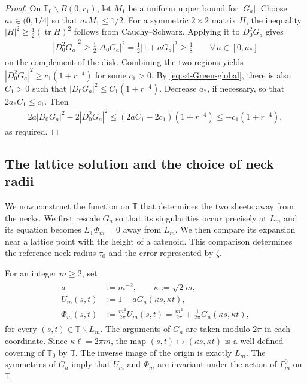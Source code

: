 \documentclass[a4paper,11pt,oneside,reqno]{amsart}
\numberwithin{equation}{section}
\theoremstyle{definition}
\begin{document}
\begin{proof}
    On $\mathbb T_0\smallsetminus B(0,r_1)$, let
    $M_1$ be a uniform upper bound for $|G_a|$.
    Choose $a_*\in(0,1/4]$ so that $a_*M_1\leq1/2$.
    For a symmetric $2\times2$ matrix $H$, the inequality
    $|H|^2\geq\frac12(\operatorname{tr}H)^2$ follows
    from Cauchy--Schwarz. Applying it to $D_0^2G_a$ gives
    \begin{align*}
        |D_0^2G_a|^2
        \geq\frac12|\Delta_0G_a|^2
        =\frac12|1+aG_a|^2\geq\frac18
        \qquad\forall\,a\in[0,a_*]
    \end{align*}
    on the complement of the disk. Combining the two
    regions yields
    $|D_0^2G_a|^2\geq c_1(1+r^{-4})$ for some $c_1>0$.
    By \eqref{eq:s4-Green-global}, there is also $C_1>0$
    such that $|D_0G_a|^2\leq C_1(1+r^{-4})$.
    Decrease $a_*$, if necessary, so that
    $2a_*C_1\leq c_1$. Then
    \begin{align*}
        2a|D_0G_a|^2-2|D_0^2G_a|^2
        \leq(2aC_1-2c_1)(1+r^{-4})
        \leq-c_1(1+r^{-4}),
    \end{align*}
    as required.
\end{proof}

\subsection{The lattice solution and the choice of neck radii}

We now construct the function on $\mathbb T$ that determines
the two sheets away from the necks. We first rescale $G_a$
so that its singularities occur precisely at $L_m$ and its
equation becomes $L_{\mathbb T}\Phi_m=0$ away from $L_m$.
We then compare its expansion near a lattice point with the
height of a catenoid. This comparison determines the reference
neck radius $\tau_0$ and the error represented by $\zeta$.

For an integer $m\geq2$, set
%
\begin{align}
    \label{eq:s4-physical-Green}
    \begin{split}
        a&:=m^{-2},\qquad \kappa:=\sqrt2m,\\
        U_m(s,t)&:=1+aG_a(\kappa s,\kappa t),\\
        \Phi_m(s,t)&:=\frac{m^2}{2\pi}U_m(s,t)
        =\frac{m^2}{2\pi}+\frac1{2\pi}G_a(\kappa s,\kappa t),
    \end{split}
\end{align}
%
for every $(s,t)\in\mathbb T\smallsetminus L_m$.
The arguments of $G_a$ are taken modulo $2\pi$ in each
coordinate. Since $\kappa\ell=2\pi m$, the map
$(s,t)\mapsto(\kappa s,\kappa t)$ is a well-defined
covering of $\mathbb T_0$ by $\mathbb T$. The inverse
image of the origin is exactly $L_m$. The symmetries of
$G_a$ imply that $U_m$ and $\Phi_m$ are invariant under
the action of $\Gamma_m^0$ on $\mathbb T$.
\end{document}
